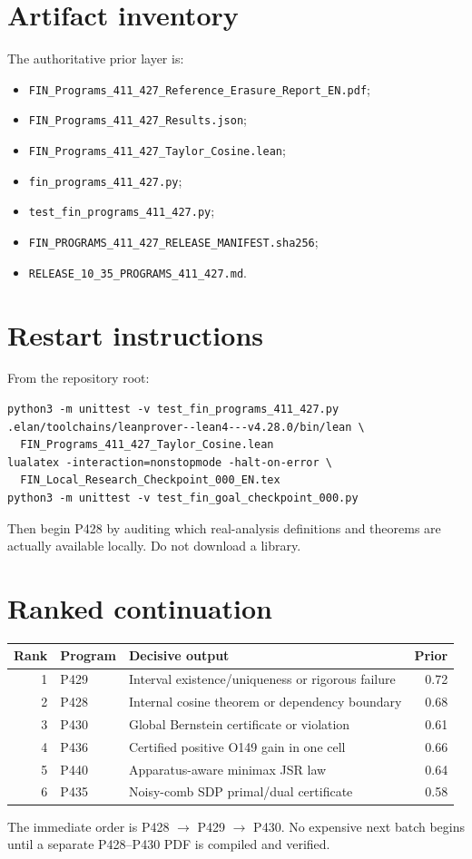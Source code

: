 \documentclass[11pt,a4paper]{article}
\begin{document}
\section{Artifact inventory}
The authoritative prior layer is:
\begin{itemize}
\item \texttt{FIN\_Programs\_411\_427\_Reference\_Erasure\_Report\_EN.pdf};
\item \texttt{FIN\_Programs\_411\_427\_Results.json};
\item \texttt{FIN\_Programs\_411\_427\_Taylor\_Cosine.lean};
\item \texttt{fin\_programs\_411\_427.py};
\item \texttt{test\_fin\_programs\_411\_427.py};
\item \texttt{FIN\_PROGRAMS\_411\_427\_RELEASE\_MANIFEST.sha256};
\item \texttt{RELEASE\_10\_35\_PROGRAMS\_411\_427.md}.
\end{itemize}

\section{Restart instructions}
From the repository root:
\begin{verbatim}
python3 -m unittest -v test_fin_programs_411_427.py
.elan/toolchains/leanprover--lean4---v4.28.0/bin/lean \
  FIN_Programs_411_427_Taylor_Cosine.lean
lualatex -interaction=nonstopmode -halt-on-error \
  FIN_Local_Research_Checkpoint_000_EN.tex
python3 -m unittest -v test_fin_goal_checkpoint_000.py
\end{verbatim}
Then begin P428 by auditing which real-analysis definitions and theorems are
actually available locally. Do not download a library.

\section{Ranked continuation}
\begin{longtable}{rllr}
\toprule
Rank & Program & Decisive output & Prior\\\midrule
1 & P429 & Interval existence/uniqueness or rigorous failure & 0.72\\
2 & P428 & Internal cosine theorem or dependency boundary & 0.68\\
3 & P430 & Global Bernstein certificate or violation & 0.61\\
4 & P436 & Certified positive O149 gain in one cell & 0.66\\
5 & P440 & Apparatus-aware minimax JSR law & 0.64\\
6 & P435 & Noisy-comb SDP primal/dual certificate & 0.58\\
\bottomrule
\end{longtable}
The immediate order is P428 $\to$ P429 $\to$ P430. No expensive next batch
begins until a separate P428--P430 PDF is compiled and verified.
\end{document}
